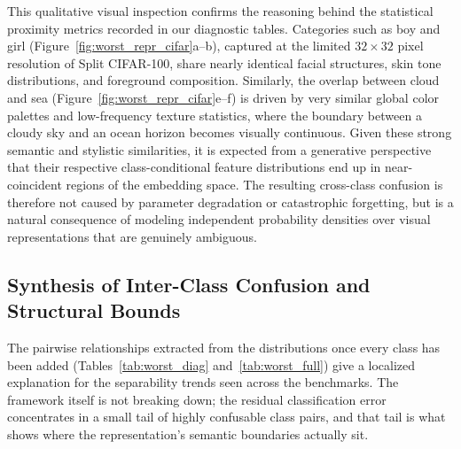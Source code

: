 This qualitative visual inspection confirms the reasoning behind the statistical proximity metrics recorded in our diagnostic tables. Categories such as boy and girl (Figure~\ref{fig:worst_repr_cifar}a--b), captured at the limited $32\times32$ pixel resolution of Split CIFAR-100, share nearly identical facial structures, skin tone distributions, and foreground composition. Similarly, the overlap between cloud and sea (Figure~\ref{fig:worst_repr_cifar}e--f) is driven by very similar global color palettes and low-frequency texture statistics, where the boundary between a cloudy sky and an ocean horizon becomes visually continuous. Given these strong semantic and stylistic similarities, it is expected from a generative perspective that their respective class-conditional feature distributions end up in near-coincident regions of the embedding space. The resulting cross-class confusion is therefore not caused by parameter degradation or catastrophic forgetting, but is a natural consequence of modeling independent probability densities over visual representations that are genuinely ambiguous.

\subsection{Synthesis of Inter-Class Confusion and Structural Bounds}
\label{sec:an:confusion}

The pairwise relationships extracted from the distributions once every class has been added (Tables~\ref{tab:worst_diag} and~\ref{tab:worst_full}) give a localized explanation for the separability trends seen across the benchmarks. The framework itself is not breaking down; the residual classification error concentrates in a small tail of highly confusable class pairs, and that tail is what shows where the representation's semantic boundaries actually sit.

